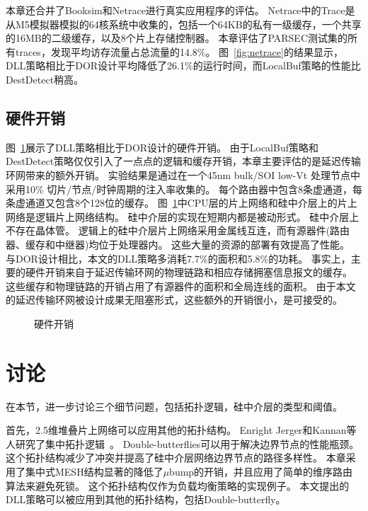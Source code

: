 本章还合并了Booksim和Netrace进行真实应用程序的评估。
Netrace中的Trace是从M5模拟器模拟的64核系统中收集的，包括一个64KB的私有一级缓存，一个共享的16MB的二级缓存，以及8个片上存储控制器。
本章评估了PARSEC测试集的所有traces，发现平均访存流量占总流量的14.8\%。
图~\ref{fig:netrace}的结果显示，DLL策略相比于DOR设计平均降低了26.1\%的运行时间，而LocalBuf策略的性能比DestDetect稍高。

\subsection{硬件开销}

图~\ref{fig:hardware}展示了DLL策略相比于DOR设计的硬件开销。
由于LocalBuf策略和DestDetect策略仅仅引入了一点点的逻辑和缓存开销，本章主要评估的是延迟传输环网带来的额外开销。
实验结果是通过在一个45nm bulk/SOI low-Vt 处理节点中采用10\% 切片/节点/时钟周期的注入率收集的。
每个路由器中包含8条虚通道，每条虚通道又包含8个128位的缓存。
图~\ref{fig:hardware}中CPU层的片上网络和硅中介层上的片上网络是逻辑片上网络结构。
硅中介层的实现在短期内都是被动形式。
硅中介层上不存在晶体管。
逻辑上的硅中介层片上网络采用金属线互连，而有源器件(路由器、缓存和中继器)均位于处理器内。
这些大量的资源的部署有效提高了性能。
与DOR设计相比，本文的DLL策略多消耗7.7\%的面积和5.8\%的功耗。
事实上，主要的硬件开销来自于延迟传输环网的物理链路和相应存储拥塞信息报文的缓存。
这些缓存和物理链路的开销占用了有源器件的面积和全局连线的面积。
由于本文的延迟传输环网被设计成果无阻塞形式，这些额外的开销很小，是可接受的。

\begin{figure}[htb]
\centering
{} 
\caption{硬件开销}
\label{fig:hardware}
\end{figure}


\section{讨论}
\label{sec:dlldiscussion}

在本节，进一步讨论三个细节问题，包括拓扑逻辑，硅中介层的类型和阈值。

首先，2.5维堆叠片上网络可以应用其他的拓扑结构。
Enright Jerger和Kannan等人研究了集中拓扑逻辑~。
Double-butterflies可以用于解决边界节点的性能瓶颈。
这个拓扑结构减少了冲突并提高了硅中介层网络边界节点的路径多样性。
本章采用了集中式MESH结构显著的降低了$\mu$bump的开销，并且应用了简单的维序路由算法来避免死锁。
这个拓扑结构仅作为负载均衡策略的实现例子。
本文提出的DLL策略可以被应用到其他的拓扑结构，包括Double-butterfly。

